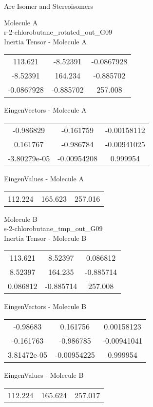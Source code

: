 \begin{center}
\vtab
\vtab
\textcolor{NavyBlue}{\Large Are Isomer and Stereoisomers}
\end{center}
\newpage
\begin{multicols}{2}
\begin{center}
Molecule A \\ 
r-2-chlorobutane\_rotated\_out\_G09
\\
Inertia Tensor - Molecule A \\
\vtab
\begin{tabular}{|c c c|}
113.621	 & 	-8.52391	 & 	-0.0867928	 \\
-8.52391	 & 	164.234	 & 	-0.885702	 \\
-0.0867928	 & 	-0.885702	 & 	257.008
\end{tabular}

\vtab
 EingenVectors - Molecule A     \\
\vtab
\begin{tabular}{|c c c|}
-0.986829	 & 	-0.161759	 & 	-0.00158112	 \\
0.161767	 & 	-0.986784	 & 	-0.00941025	 \\
-3.80279e-05	 & 	-0.00954208	 & 	0.999954
\end{tabular}

\vtab
 EingenValues - Molecule A     \\
\vtab
\begin{tabular}{|c c c|}
112.224	 & 	165.623	 & 	257.016
\end{tabular}
\columnbreak

Molecule B \\ 
s-2-chlorobutane\_tmp\_out\_G09
\\
Inertia Tensor - Molecule B \\
\vtab
\begin{tabular}{|c c c|}
113.621	 & 	8.52397	 & 	0.086812	 \\
8.52397	 & 	164.235	 & 	-0.885714	 \\
0.086812	 & 	-0.885714	 & 	257.008
\end{tabular}

\vtab
 EingenVectors - Molecule B     \\
\vtab
\begin{tabular}{|c c c|}
-0.98683	 & 	0.161756	 & 	0.00158123	 \\
-0.161763	 & 	-0.986785	 & 	-0.00941041	 \\
3.81472e-05	 & 	-0.00954225	 & 	0.999954
\end{tabular}

\vtab
 EingenValues - Molecule B     \\
\vtab
\begin{tabular}{|c c c|}
112.224	 & 	165.624	 & 	257.017
\end{tabular}

\end{center}
\end{multicols}
